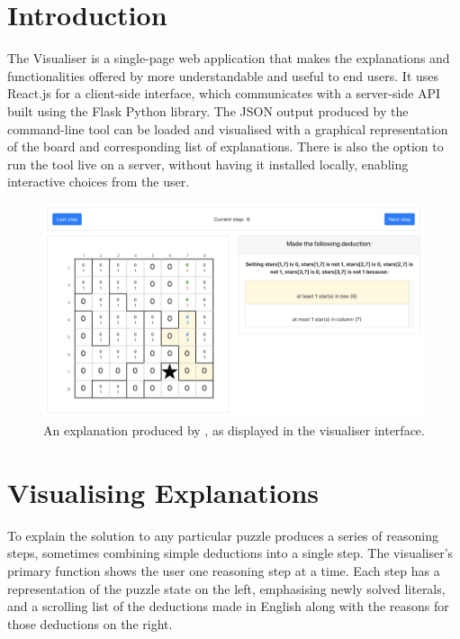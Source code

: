 \documentclass[10pt]{article}
\begin{document}
\maketitle

\section{Introduction}
The \demystify Visualiser is a single-page web application that makes the explanations and functionalities offered by \demystify more understandable and useful to end users. It uses React.js for a client-side interface, which communicates with a server-side API built using the Flask Python library. The JSON output produced by the \demystify command-line tool can be loaded and visualised with a graphical representation of the board and corresponding list of explanations. There is also the option to run the tool live on a server, without having it installed locally, enabling interactive choices from the user. 

\begin{figure}[h]
    \begin{center}
        \includegraphics[width=\textwidth]{visualiser1}
    \end{center}
   \caption{ An explanation produced by \demystify, as displayed in the visualiser interface.}
\end{figure}

\section{Visualising Explanations}
To explain the solution to any particular puzzle \demystify produces a series of reasoning steps, sometimes combining simple deductions into a single step. The visualiser's primary function shows the user one reasoning step at a time. Each step has a representation of the puzzle state on the left, emphasising newly solved literals, and a scrolling list of the deductions made in English along with the reasons for those deductions on the right. 
\end{document}
